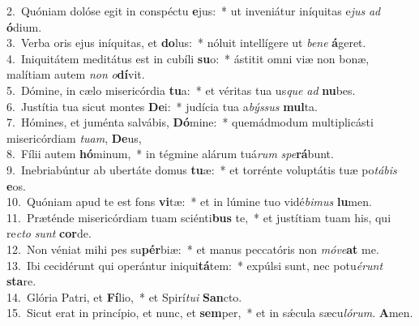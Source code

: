 {2.~}Quóniam dolóse egit in conspéctu \textbf{e}jus:~* ut inveniátur iníquitas e\textit{jus} \textit{ad} \textbf{ó}dium.\\
{3.~}Verba oris ejus iníquitas, et \textbf{do}lus:~* nóluit intellígere ut \textit{be}\textit{ne} \textbf{á}geret.\\
{4.~}Iniquitátem meditátus est in cubíli \textbf{su}o:~* ástitit omni viæ non bonæ, malítiam autem \textit{non} \textit{o}\textbf{dí}vit.\\
{5.~}Dómine, in cælo misericórdia \textbf{tu}a:~* et véritas tua us\textit{que} \textit{ad} \textbf{nu}bes.\\
{6.~}Justítia tua sicut montes \textbf{De}i:~* judícia tua a\textit{býs}\textit{sus} \textbf{mul}ta.\\
{7.~}Hómines, et juménta salvábis, \textbf{Dó}mine:~* quemádmodum multiplicásti misericórdiam \textit{tu}\textit{am}, \textbf{De}us,\\
{8.~}Fílii autem \textbf{hó}minum,~* in tégmine alárum tuá\textit{rum} \textit{spe}\textbf{rá}bunt.\\
{9.~}Inebriabúntur ab ubertáte domus \textbf{tu}æ:~* et torrénte voluptátis tuæ po\textit{tá}\textit{bis} \textbf{e}os.\\
{10.~}Quóniam apud te est fons \textbf{vi}tæ:~* et in lúmine tuo vidé\textit{bi}\textit{mus} \textbf{lu}men.\\
{11.~}Præténde misericórdiam tuam sciénti\textbf{bus} te,~* et justítiam tuam his, qui re\textit{cto} \textit{sunt} \textbf{cor}de.\\
{12.~}Non véniat mihi pes su\textbf{pér}biæ:~* et manus peccatóris non \textit{mó}\textit{ve}\textbf{at} me.\\
{13.~}Ibi cecidérunt qui operántur iniqui\textbf{tá}tem:~* expúlsi sunt, nec potu\textit{é}\textit{runt} \textbf{sta}re.\\
{14.~}Glória Patri, et \textbf{Fí}lio,~* et Spirí\textit{tu}\textit{i} \textbf{San}cto.\\
{15.~}Sicut erat in princípio, et nunc, et \textbf{sem}per,~* et in sǽcula sæcu\textit{ló}\textit{rum}. \textbf{A}men.\\
